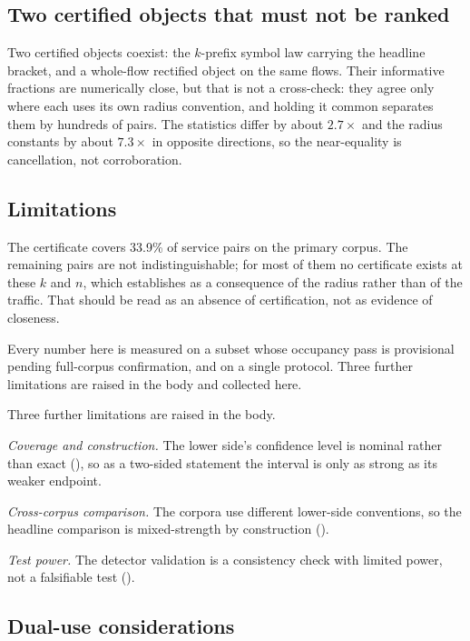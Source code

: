 \subsection{Two certified objects that must not be ranked}
\label{sec:discussion/objects}

Two certified objects coexist: the $k$-prefix symbol law carrying the headline
bracket, and a whole-flow rectified object on the same flows. Their informative
fractions are numerically close, but that is not a cross-check: they agree only
where each uses its own radius convention, and holding it common separates them by
hundreds of pairs. The statistics differ by about $2.7\times$ and the radius
constants by about $7.3\times$ in opposite directions, so the near-equality is
cancellation, not corroboration.

\subsection{Limitations}
\label{sec:discussion/limitations}

The certificate covers 33.9\% of service pairs on the primary corpus. The
remaining pairs are not indistinguishable; for most of them no certificate
exists at these $k$ and $n$, which  establishes as a
consequence of the radius rather than of the traffic. That should be read as an
absence of certification, not as evidence of closeness.

Every number here is measured on a subset whose occupancy pass is provisional
pending full-corpus confirmation, and on a single protocol. Three further
limitations are raised in the body and collected here.

Three further limitations are raised in the body.

\emph{Coverage and construction.} The lower side's confidence level is nominal
rather than exact (), so as a two-sided statement the
interval is only as strong as its weaker endpoint.

\emph{Cross-corpus comparison.} The corpora use different lower-side
conventions, so the headline comparison is mixed-strength by construction
().

\emph{Test power.} The detector validation is a consistency check with limited
power, not a falsifiable test ().

\subsection{Dual-use considerations}
\label{sec:discussion/ethics}

